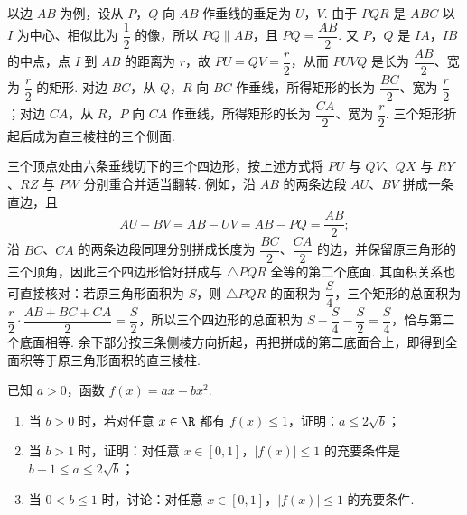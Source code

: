 \begin{solution}
\begin{enumerate}
以边 \(AB\) 为例，设从 \(P\)，\(Q\) 向 \(AB\) 作垂线的垂足为 \(U\)，\(V\). 由于 \(PQR\) 是 \(ABC\) 以 \(I\) 为中心、相似比为 \(\dfrac12\) 的像，所以 \(PQ\parallel AB\)，且 \(PQ=\dfrac{AB}{2}\). 又 \(P\)，\(Q\) 是 \(IA\)，\(IB\) 的中点，点 \(I\) 到 \(AB\) 的距离为 \(r\)，故 \(PU=QV=\dfrac r2\)，从而 \(PUVQ\) 是长为 \(\dfrac{AB}{2}\)、宽为 \(\dfrac r2\) 的矩形. 对边 \(BC\)，从 \(Q\)，\(R\) 向 \(BC\) 作垂线，所得矩形的长为 \(\dfrac{BC}{2}\)、宽为 \(\dfrac r2\)；对边 \(CA\)，从 \(R\)，\(P\) 向 \(CA\) 作垂线，所得矩形的长为 \(\dfrac{CA}{2}\)、宽为 \(\dfrac r2\). 三个矩形折起后成为直三棱柱的三个侧面.

三个顶点处由六条垂线切下的三个四边形，按上述方式将 \(PU\) 与 \(QV\)、\(QX\) 与 \(RY\)、\(RZ\) 与 \(PW\) 分别重合并适当翻转. 例如，沿 \(AB\) 的两条边段 \(AU\)、\(BV\) 拼成一条直边，且
\[
AU+BV=AB-UV=AB-PQ=\frac{AB}{2};
\]
沿 \(BC\)、\(CA\) 的两条边段同理分别拼成长度为 \(\dfrac{BC}{2}\)、\(\dfrac{CA}{2}\) 的边，并保留原三角形的三个顶角，因此三个四边形恰好拼成与 \(\triangle PQR\) 全等的第二个底面. 其面积关系也可直接核对：若原三角形面积为 \(S\)，则 \(\triangle PQR\) 的面积为 \(\dfrac S4\)，三个矩形的总面积为 \(\dfrac r2\cdot\dfrac{AB+BC+CA}{2}=\dfrac S2\)，所以三个四边形的总面积为 \(S-\dfrac S4-\dfrac S2=\dfrac S4\)，恰与第二个底面相等. 余下部分按三条侧棱方向折起，再把拼成的第二底面合上，即得到全面积等于原三角形面积的直三棱柱.
\end{enumerate}
\end{solution}

\begin{problem}
已知 \(a > 0\)，函数 \(f(x) = ax - bx^{2}\).

\begin{enumerate}
\item 当 \(b > 0\) 时，若对任意 \(x \in \R\) 都有 \(f(x) \leqslant 1\)，证明：\(a \leqslant 2\sqrt{b}\)；
\item 当 \(b > 1\) 时，证明：对任意 \(x \in [0,1]\)，\(|f(x)| \leqslant 1\) 的充要条件是 \(b - 1 \leqslant a \leqslant 2\sqrt{b}\)；
\item 当 \(0 < b \leqslant 1\) 时，讨论：对任意 \(x \in [0,1]\)，\(|f(x)| \leqslant 1\) 的充要条件.
\end{enumerate}
\end{problem}


